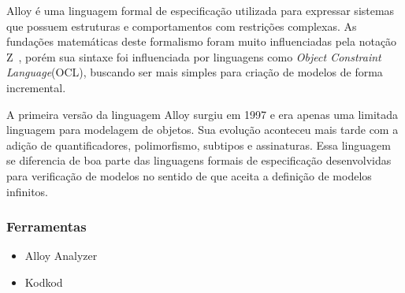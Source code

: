 Alloy é uma linguagem formal de especificação utilizada para expressar sistemas que possuem
estruturas e comportamentos com restrições complexas. As fundações matemáticas deste formalismo
foram muito influenciadas pela notação Z~\cite{opac-b1091336}, porém sua sintaxe foi influenciada
por linguagens como \textit{Object Constraint Language}(OCL), buscando ser mais simples para
criação de modelos de forma incremental.

A primeira versão da linguagem Alloy surgiu em 1997 e era apenas uma limitada linguagem para modelagem
de objetos. Sua evolução aconteceu mais tarde com a adição de quantificadores, polimorfismo, subtipos e
assinaturas. Essa linguagem se diferencia de boa parte das linguagens formais de especificação desenvolvidas
para verificação de modelos no sentido de que aceita a definição de modelos infinitos.

\subsubsection{Ferramentas}
\begin{itemize}
\item{Alloy Analyzer}
\item{Kodkod}
\end{itemize}
